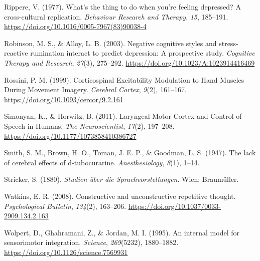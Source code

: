 \documentclass[a4paper,12pt,twoside,openright,oldfontcommands]{memoir}
\begin{document}
\hypertarget{ref-Rippere1977}{}
Rippere, V. (1977). What's the thing to do when you're feeling
depressed? A cross-cultural replication. \emph{Behaviour Research and
Therapy}, \emph{15}, 185--191.
\url{https://doi.org/10.1016/0005-7967(83)90038-4}

\hypertarget{ref-Robinson2003}{}
Robinson, M. S., \& Alloy, L. B. (2003). Negative cognitive styles and
stress-reactive rumination interact to predict depression: A prospective
study. \emph{Cognitive Therapy and Research}, \emph{27}(3), 275--292.
\url{https://doi.org/10.1023/A:1023914416469}

\hypertarget{ref-rossini_corticospinal_1999}{}
Rossini, P. M. (1999). Corticospinal Excitability Modulation to Hand
Muscles During Movement Imagery. \emph{Cerebral Cortex}, \emph{9}(2),
161--167. \url{https://doi.org/10.1093/cercor/9.2.161}

\hypertarget{ref-simonyan_laryngeal_2011}{}
Simonyan, K., \& Horwitz, B. (2011). Laryngeal Motor Cortex and Control
of Speech in Humans. \emph{The Neuroscientist}, \emph{17}(2), 197--208.
\url{https://doi.org/10.1177/1073858410386727}

\hypertarget{ref-smith_lack_1947}{}
Smith, S. M., Brown, H. O., Toman, J. E. P., \& Goodman, L. S. (1947).
The lack of cerebral effects of d-tubocurarine. \emph{Anesthesiology},
\emph{8}(1), 1--14.

\hypertarget{ref-stricker_studien_1880}{}
Stricker, S. (1880). \emph{Studien über die Sprachvorstellungen}. Wien:
Braumüller.

\hypertarget{ref-Watkins2008}{}
Watkins, E. R. (2008). Constructive and unconstructive repetitive
thought. \emph{Psychological Bulletin}, \emph{134}(2), 163--206.
\url{https://doi.org/10.1037/0033-2909.134.2.163}

\hypertarget{ref-wolpert_internal_1995}{}
Wolpert, D., Ghahramani, Z., \& Jordan, M. I. (1995). An internal model
for sensorimotor integration. \emph{Science}, \emph{269}(5232),
1880--1882. \url{https://doi.org/10.1126/science.7569931}
\end{document}
